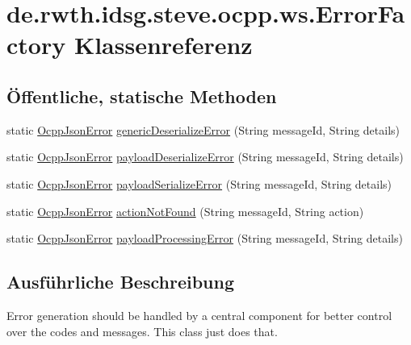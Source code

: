 \hypertarget{classde_1_1rwth_1_1idsg_1_1steve_1_1ocpp_1_1ws_1_1_error_factory}{\section{de.\+rwth.\+idsg.\+steve.\+ocpp.\+ws.\+Error\+Factory Klassenreferenz}
\label{classde_1_1rwth_1_1idsg_1_1steve_1_1ocpp_1_1ws_1_1_error_factory}
}
\subsection*{Öffentliche, statische Methoden}
\begin{DoxyCompactItemize}
\item 
static \hyperlink{classde_1_1rwth_1_1idsg_1_1steve_1_1ocpp_1_1ws_1_1data_1_1_ocpp_json_error}{Ocpp\+Json\+Error} \hyperlink{classde_1_1rwth_1_1idsg_1_1steve_1_1ocpp_1_1ws_1_1_error_factory_a2db20dbc0ac39ded7843ff0167402f43}{generic\+Deserialize\+Error} (String message\+Id, String details)
\item 
static \hyperlink{classde_1_1rwth_1_1idsg_1_1steve_1_1ocpp_1_1ws_1_1data_1_1_ocpp_json_error}{Ocpp\+Json\+Error} \hyperlink{classde_1_1rwth_1_1idsg_1_1steve_1_1ocpp_1_1ws_1_1_error_factory_aea04a7226503210ba5672606c47532d0}{payload\+Deserialize\+Error} (String message\+Id, String details)
\item 
static \hyperlink{classde_1_1rwth_1_1idsg_1_1steve_1_1ocpp_1_1ws_1_1data_1_1_ocpp_json_error}{Ocpp\+Json\+Error} \hyperlink{classde_1_1rwth_1_1idsg_1_1steve_1_1ocpp_1_1ws_1_1_error_factory_ad51500921339048842705b1a1a9acd39}{payload\+Serialize\+Error} (String message\+Id, String details)
\item 
static \hyperlink{classde_1_1rwth_1_1idsg_1_1steve_1_1ocpp_1_1ws_1_1data_1_1_ocpp_json_error}{Ocpp\+Json\+Error} \hyperlink{classde_1_1rwth_1_1idsg_1_1steve_1_1ocpp_1_1ws_1_1_error_factory_aea3a0c5d1cded6a34744d66f8800616f}{action\+Not\+Found} (String message\+Id, String action)
\item 
static \hyperlink{classde_1_1rwth_1_1idsg_1_1steve_1_1ocpp_1_1ws_1_1data_1_1_ocpp_json_error}{Ocpp\+Json\+Error} \hyperlink{classde_1_1rwth_1_1idsg_1_1steve_1_1ocpp_1_1ws_1_1_error_factory_aa9a4554e30593e6825c4a301e5f2badc}{payload\+Processing\+Error} (String message\+Id, String details)
\end{DoxyCompactItemize}


\subsection{Ausführliche Beschreibung}
Error generation should be handled by a central component for better control over the codes and messages. This class just does that.

